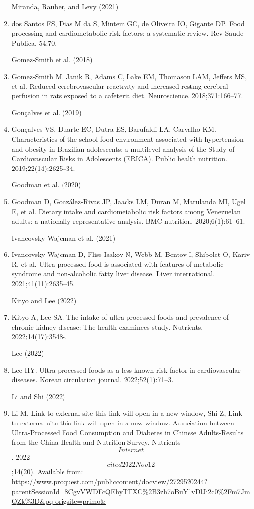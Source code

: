 \documentclass[
]{article}
\begin{document}
\begin{enumerate}
  Miranda, Rauber, and Levy (2021)
\item
  dos Santos FS, Dias M da S, Mintem GC, de Oliveira IO, Gigante DP.
  Food processing and cardiometabolic risk factors: a systematic review.
  Rev Saude Publica. 54:70.

  Gomez-Smith et al. (2018)
\item
  Gomez-Smith M, Janik R, Adams C, Lake EM, Thomason LAM, Jeffers MS, et
  al. Reduced cerebrovascular reactivity and increased resting cerebral
  perfusion in rats exposed to a cafeteria diet. Neuroscience.
  2018;371:166--77.

  Gonçalves et al. (2019)
\item
  Gonçalves VS, Duarte EC, Dutra ES, Barufaldi LA, Carvalho KM.
  Characteristics of the school food environment associated with
  hypertension and obesity in Brazilian adolescents: a multilevel
  analysis of the Study of Cardiovascular Risks in Adolescents (ERICA).
  Public health nutrition. 2019;22(14):2625--34.

  Goodman et al. (2020)
\item
  Goodman D, González-Rivas JP, Jaacks LM, Duran M, Marulanda MI, Ugel
  E, et al. Dietary intake and cardiometabolic risk factors among
  Venezuelan adults: a nationally representative analysis. BMC
  nutrition. 2020;6(1):61--61.

  Ivancovsky-Wajcman et al. (2021)
\item
  Ivancovsky‐Wajcman D, Fliss‐Isakov N, Webb M, Bentov I, Shibolet O,
  Kariv R, et al. Ultra‐processed food is associated with features of
  metabolic syndrome and non‐alcoholic fatty liver disease. Liver
  international. 2021;41(11):2635--45.

  Kityo and Lee (2022)
\item
  Kityo A, Lee SA. The intake of ultra-processed foods and prevalence of
  chronic kidney disease: The health examinees study. Nutrients.
  2022;14(17):3548-.

  Lee (2022)
\item
  Lee HY. Ultra-processed foods as a less-known risk factor in
  cardiovascular diseases. Korean circulation journal. 2022;52(1):71--3.

  Li and Shi (2022)
\item
  Li M, Link to external site this link will open in a new window, Shi
  Z, Link to external site this link will open in a new window.
  Association between Ultra-Processed Food Consumption and Diabetes in
  Chinese Adults-Results from the China Health and Nutrition Survey.
  Nutrients \[Internet\]. 2022 \[cited 2022 Nov 12\];14(20). Available
  from:
  \url{https://www.proquest.com/publiccontent/docview/2729520244?parentSessionId=8CgvVWDFcQEhyTTXC\%2B3zh7oBuY1vDlJi2c0\%2Fm7JmQZk\%3D\&pq-origsite=primo\&}


\end{enumerate}
\end{document}
